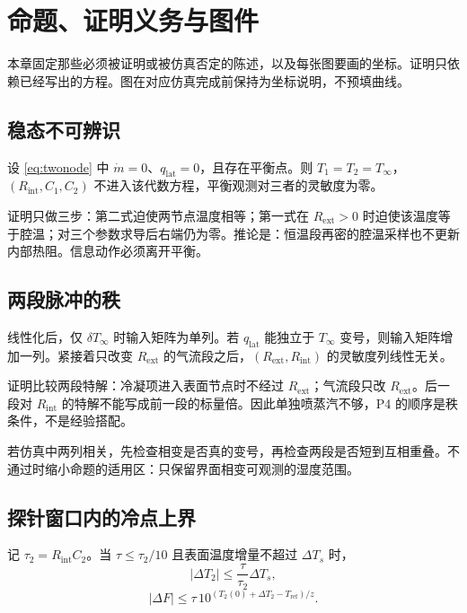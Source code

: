 \chapter{命题、证明义务与图件}
\label{ch:proof}

本章固定那些必须被证明或被仿真否定的陈述，以及每张图要画的坐标。证明只依赖已经写出的方程。图在对应仿真完成前保持为坐标说明，不预填曲线。

\section{稳态不可辨识}

\begin{proposition}[平衡点不含内部参数]
\label{prop:steady}
设 \eqref{eq:twonode} 中 $\dot m=0$、$q_{\mathrm{lat}}=0$，且存在平衡点。则 $T_1=T_2=T_\infty$，$(R_{\mathrm{int}},C_1,C_2)$ 不进入该代数方程，平衡观测对三者的灵敏度为零。
\end{proposition}

证明只做三步：第二式迫使两节点温度相等；第一式在 $R_{\mathrm{ext}}>0$ 时迫使该温度等于腔温；对三个参数求导后右端仍为零。推论是：恒温段再密的腔温采样也不更新内部热阻。信息动作必须离开平衡。

\section{两段脉冲的秩}

\begin{proposition}[第二输入方向]
\label{prop:pulse}
线性化后，仅 $\delta T_\infty$ 时输入矩阵为单列。若 $q_{\mathrm{lat}}$ 能独立于 $T_\infty$ 变号，则输入矩阵增加一列。紧接着只改变 $R_{\mathrm{ext}}$ 的气流段之后，$(R_{\mathrm{ext}},R_{\mathrm{int}})$ 的灵敏度列线性无关。
\end{proposition}

证明比较两段特解：冷凝项进入表面节点时不经过 $R_{\mathrm{ext}}$；气流段只改 $R_{\mathrm{ext}}$。后一段对 $R_{\mathrm{int}}$ 的特解不能写成前一段的标量倍。因此单独喷蒸汽不够，P4 的顺序是秩条件，不是经验搭配。

若仿真中两列相关，先检查相变是否真的变号，再检查两段是否短到互相重叠。不通过时缩小命题的适用区：只保留界面相变可观测的湿度范围。

\section{探针窗口内的冷点上界}

\begin{proposition}[冷点增量]
\label{prop:budget}
记 $\tau_2=R_{\mathrm{int}}C_2$。当 $\tau\le\tau_2/10$ 且表面温度增量不超过 $\Delta T_s$ 时，
\[
|\Delta T_2|\le\frac{\tau}{\tau_2}\Delta T_s,
\]
\[
|\Delta F|\le\tau\,10^{(T_2(0)+\Delta T_2-T_{\mathrm{ref}})/z}.
\]
\end{proposition}


